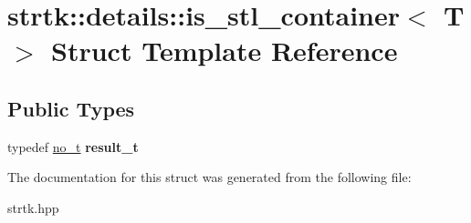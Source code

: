 \hypertarget{structstrtk_1_1details_1_1is__stl__container}{\section{strtk\-:\-:details\-:\-:is\-\_\-stl\-\_\-container$<$ T $>$ Struct Template Reference}
\label{structstrtk_1_1details_1_1is__stl__container}
}
\subsection*{Public Types}
\begin{DoxyCompactItemize}
\item 
\hypertarget{structstrtk_1_1details_1_1is__stl__container_aa5f8f1ce1b84aad7156aed004b057c94}{typedef \hyperlink{structstrtk_1_1details_1_1no__t}{no\-\_\-t} {\bfseries result\-\_\-t}}\label{structstrtk_1_1details_1_1is__stl__container_aa5f8f1ce1b84aad7156aed004b057c94}

\end{DoxyCompactItemize}


The documentation for this struct was generated from the following file\-:\begin{DoxyCompactItemize}
\item 
strtk.\-hpp\end{DoxyCompactItemize}
